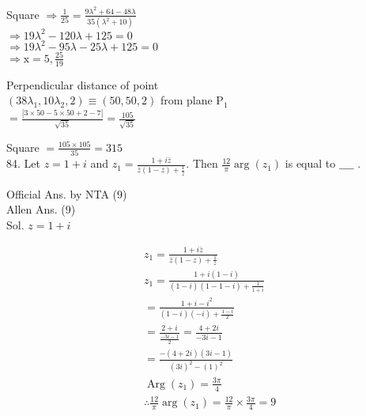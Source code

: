 \documentclass[10pt]{article}
\begin{document}
Square \(\Rightarrow \frac{1}{25}=\frac{9 \lambda^{2}+64-48 \lambda}{35\left(\lambda^{2}+10\right)}\)\\
\(\Rightarrow 19 \lambda^{2}-120 \lambda+125=0\)\\
\(\Rightarrow 19 \lambda^{2}-95 \lambda-25 \lambda+125=0\)\\
\(\Rightarrow \mathrm{x}=5, \frac{25}{19}\)

Perpendicular distance of point\\
\(\left(38 \lambda_{1}, 10 \lambda_{2}, 2\right) \equiv(50,50,2)\) from plane \(\mathrm{P}_{1}\)\\
\(=\frac{|3 \times 50-5 \times 50+2-7|}{\sqrt{35}}=\frac{105}{\sqrt{35}}\)

Square \(=\frac{105 \times 105}{35}=315\)\\
84. Let \(z=1+i\) and \(z_{1}=\frac{1+i \bar{z}}{\bar{z}(1-z)+\frac{1}{z}}\). Then \(\frac{12}{\pi} \arg \left(z_{1}\right)\) is equal to \(\_\_\_\_\) .

Official Ans. by NTA (9)\\
Allen Ans. (9)\\
Sol. \(z=1+i\)

\[
\begin{aligned}
& z_{1}=\frac{1+i \bar{z}}{\bar{z}(1-z)+\frac{1}{z}} \\
& z_{1}=\frac{1+i(1-i)}{(1-i)(1-1-i)+\frac{1}{1+i}} \\
& =\frac{1+i-i^{2}}{(1-i)(-i)+\frac{1-i}{2}} \\
& =\frac{2+i}{\frac{-3 i-1}{2}}=\frac{4+2 i}{-3 i-1} \\
& =\frac{-(4+2 i)(3 i-1)}{(3 i)^{2}-(1)^{2}} \\
& \operatorname{Arg}\left(z_{1}\right)=\frac{3 \pi}{4} \\
& \therefore \frac{12}{\pi} \arg \left(z_{1}\right)=\frac{12}{\pi} \times \frac{3 \pi}{4}=9
\end{aligned}
\]
\end{document}
